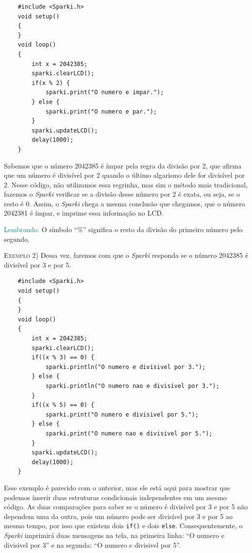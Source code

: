     \begin{verbatim}
    #include <Sparki.h>
    void setup()
    {
    }
    void loop()
    {
        int x = 2042385;
        sparki.clearLCD();
        if(x % 2) {
            sparki.print("O numero e impar.");
        } else {
            sparki.print("O numero e par.");
        }
        sparki.updateLCD();
        delay(1000);
    }
    \end{verbatim}
    
    Sabemos que o número 2042385 é ímpar pela regra da divisão por 2, que afirma que um número é divisível por 2 quando o último algarismo dele for divisível por 2. Nesse código, não utilizamos essa regrinha, mas sim o método mais tradicional, fazemos o \textsl{Sparki} verificar se a divisão desse número por 2 é exata, ou seja, se o resto é 0. Assim, o \textsl{Sparki} chega a mesma conclusão que chegamos, que o número 2042381 é ímpar, e imprime essa informação no LCD.
    
    \begin{center}
    \textcolor{teal}{Lembrando:}
    O símbolo ``\%'' significa o resto da divisão do primeiro número pelo segundo.
    \end{center}
    
    \textsc{Exemplo 2)} Dessa vez, faremos com que o \textsl{Sparki} responda se o número 2042385 é divisível por 3 e por 5.
    
    \begin{verbatim}
    #include <Sparki.h>
    void setup()
    {
    }
    void loop()
    {
        int x = 2042385;
        sparki.clearLCD();
        if((x % 3) == 0) {
            sparki.println("O numero e divisivel por 3.");
        } else {
            sparki.println("O numero nao e divisivel por 3.");
        }
        if((x % 5) == 0) {
            sparki.print("O numero e divisivel por 5.");
        } else {
            sparki.print("O numero nao e divisivel por 5.");
        }
        sparki.updateLCD();
        delay(1000);
    }
    \end{verbatim}
    
    Esse exemplo é parecido com o anterior, mas ele está aqui para mostrar que podemos inserir duas estruturas condicionais independentes em um mesmo código. As duas comparações para saber se o número é divisível por 3 e por 5 não dependem uma da outra, pois um número pode ser divisível por 3 e por 5 ao mesmo tempo, por isso que existem dois \texttt{if()} e dois \texttt{else}. Consequentemente, o \textsl{Sparki} imprimirá duas mensagens na tela, na primeira linha: ``O numero e divisivel por 3'' e na segunda: ``O numero e divisivel por 5''.
    
